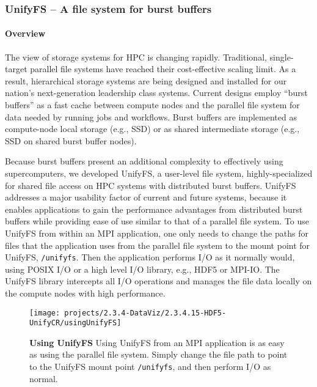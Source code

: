 \subsubsection{ UnifyFS -- A file system for burst buffers} 

\paragraph{Overview} 

The view of storage systems for HPC is changing rapidly. Traditional, 
single-target parallel file systems have reached their cost-effective 
scaling limit. As a result, hierarchical storage systems are being designed 
and installed for our nation's next-generation leadership class systems. 
Current designs employ “burst buffers” as a fast cache between compute 
nodes and the parallel file system for data needed by running jobs and 
workflows. Burst buffers are implemented as compute-node local storage 
(e.g., SSD) or as shared intermediate storage (e.g., SSD on shared burst 
buffer nodes).

Because burst buffers present an additional complexity to effectively
using supercomputers, we developed UnifyFS, a user-level file system, 
highly-specialized for shared file access on HPC systems with distributed 
burst buffers.  UnifyFS addresses a major usability 
factor of current and future systems, because it enables
applications to gain the performance advantages from distributed burst buffers 
while providing ease of use similar to that of a parallel file system.
To use UnifyFS from within an MPI application, one only needs to change 
the paths for files that the application uses from the parallel file system 
to the mount point for UnifyFS, \texttt{/unifyfs}. Then the application
performs I/O as it normally would, using POSIX I/O or a high level I/O library, e.g.,
HDF5 or MPI-IO. The UnifyFS library intercepts all I/O operations and 
manages the file data locally on the compute nodes with high performance.

\begin{figure}[htb]
        \centering
        \texttt{[image: projects/2.3.4-DataViz/2.3.4.15-HDF5-UnifyCR/usingUnifyFS]}
        \caption{\label{fig:usingUnifyFS} \textbf{Using UnifyFS} 
Using UnifyFS from an MPI application is as easy as using the parallel file system. 
Simply change the file path to point to the UnifyFS mount point \texttt{/unifyfs}, and
then perform I/O as normal.} 
\end{figure}


